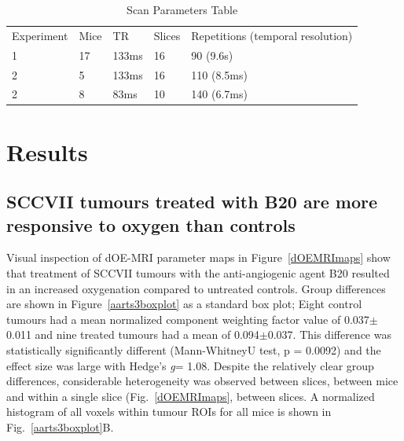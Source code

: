 \begin{table}[]
\centering
\begin{tabular}{lllll}
Experiment & Mice & TR & Slices & Repetitions (temporal resolution) \\
 1 & 17 & 133ms & 16 & 90 (9.6s)  \\
 2 & 5 & 133ms & 16 &  110 (8.5ms)  \\
 2 & 8 & 83ms & 10 & 140 (6.7ms) \\
\end{tabular}
\caption{Scan Parameters Table}
\label{scanparams}
\end{table}

\section{Results} 

\subsection{SCCVII tumours treated with B20 are more responsive to oxygen than controls}

Visual inspection of \ac{dOE-MRI} parameter maps in Figure~\ref{dOEMRImaps} show that treatment of SCCVII tumours with the anti-angiogenic agent B20 resulted in an increased oxygenation compared to untreated controls.
Group differences are shown in Figure~\ref{aarts3boxplot} as a standard box plot; Eight control tumours had a mean normalized component weighting factor value of 0.037$\pm$0.011 and nine treated tumours had a mean of 0.094$\pm$0.037.
This difference was statistically significantly different (Mann-WhitneyU test, p = 0.0092) and the effect size was large with Hedge's \emph{g}= 1.08.
Despite the relatively clear group differences, considerable heterogeneity was observed between slices, between mice and within a single slice (Fig.~\ref{dOEMRImaps}, between slices.
A normalized~ histogram of all voxels within tumour ROIs for all mice is shown in Fig.~\ref{aarts3boxplot}B.

